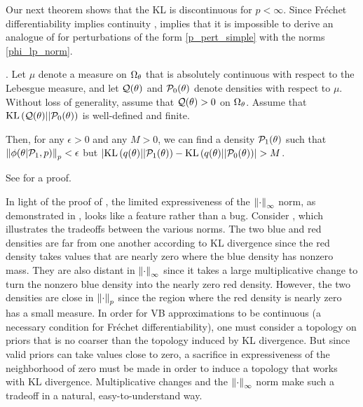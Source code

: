 Our next theorem shows that the KL is discontinuous for $p < \infty$.
Since Fr{\'e}chet differentiability implies continuity \citep[Proposition 4.8
(d)]{zeidler:2013:functional},  implies that it is
impossible to derive an analogue of  for perturbations of
the form \eqref{p_pert_simple} with the norms \eqref{phi_lp_norm}.
%
\begin{thm}
%
. Let $\mu$ denote a measure on $\Omega_{\theta}$ that is
absolutely continuous with respect to the Lebesgue measure, and let $\mathcal{Q}(\theta)$
and $\mathcal{P}_{0}(\theta)$ denote densities with respect to $\mu$.  Without loss of
generality, assume that $\mathcal{Q}(\theta) > 0$ on $\Omega_{\theta}$.  Assume that
$\mathrm{KL}\left(\mathcal{Q}(\theta) || \mathcal{P}_{0}(\theta)\right)$ is well-defined and finite.

Then, for any $\epsilon > 0$ and any $M > 0$, we can find a density
$\mathcal{P}_{1}(\theta)$ such that $\left\Vert\phi(\theta \vert \mathcal{P}_{1}, p)\right\Vert_p < \epsilon$ but
$\left|\mathrm{KL}\left(q(\theta) || \mathcal{P}_{1}(\theta)\right) - \mathrm{KL}\left(q(\theta) || \mathcal{P}_{0}(\theta)\right)\right| > M$.
%
\end{thm}
%
See  for a proof.

In light of the proof of , the limited
expressiveness of the $\left\Vert\cdot\right\Vert_{\infty}$ norm, as demonstrated in
, 
looks like a feature rather than a bug.
Consider , which illustrates the tradeoffs between
the various norms.  The two blue and red densities are far from one another according
to KL divergence since the red density takes values that are
nearly zero where the blue density has nonzero mass. They are also distant in
$\left\Vert\cdot\right\Vert_{\infty}$ since it takes a large multiplicative change
to turn the nonzero blue density into the nearly zero red density. However, the
two densities are close in $\left\Vert\cdot\right\Vert_{p}$ since the region where the red
density is nearly zero has a small measure. In order for VB approximations to be
continuous (a necessary condition for Fr{\'e}chet differentiability), one must
consider a topology on priors that is no coarser than the topology induced by KL
divergence.  But since valid priors can take values close to zero, a sacrifice
in expressiveness of the neighborhood of zero must be made in order to induce a
topology that works with KL divergence. Multiplicative changes and the
$\left\Vert\cdot\right\Vert_{\infty}$ norm make such a tradeoff in a natural, easy-to-understand
way.


